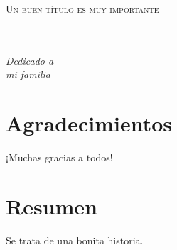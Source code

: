 \documentclass[a4paper,openright,12pt]{book}
\begin{document}
\begin{titlepage}
\begin{center}
\begin{Huge}
\textsc{Un buen título es muy importante}
\end{Huge}
\end{center}
\end{titlepage}

\newpage
$\ $
\thispagestyle{empty} 

\chapter*{}
\begin{flushright}
\textit{Dedicado a \\
mi familia}
\end{flushright}

\chapter*{Agradecimientos}
\thispagestyle{empty}


¡Muchas gracias a todos!

\chapter*{Resumen}

Se trata de una bonita historia.

\tableofcontents

\cleardoublepage
\listoffigures

\cleardoublepage
\listoftables 
\end{document}
